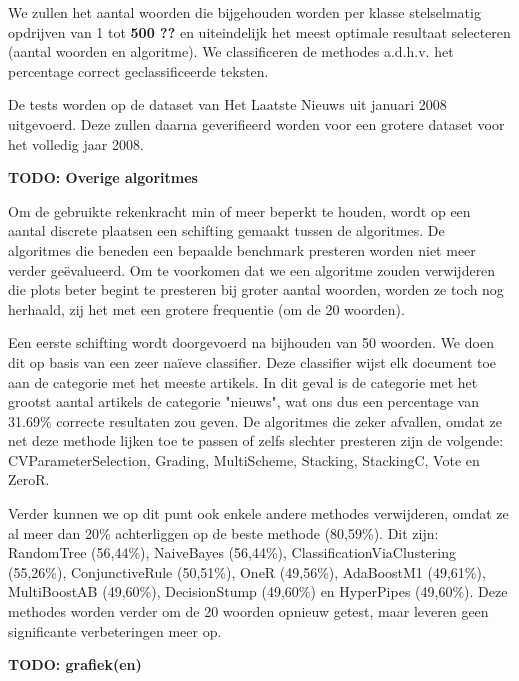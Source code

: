 We zullen het aantal woorden die bijgehouden worden per klasse stelselmatig opdrijven van 1 tot \textbf{500 ??} en uiteindelijk het meest optimale resultaat selecteren (aantal woorden en algoritme). We classificeren de methodes a.d.h.v. het percentage correct geclassificeerde teksten.

De tests worden op de dataset van Het Laatste Nieuws uit januari 2008 uitgevoerd. Deze zullen daarna geverifieerd worden voor een grotere dataset voor het volledig jaar 2008. 

\textbf{TODO: Overige algoritmes}

Om de gebruikte rekenkracht min of meer beperkt te houden, wordt op een aantal discrete plaatsen een schifting gemaakt tussen de algoritmes. De algoritmes die beneden een bepaalde benchmark presteren worden niet meer verder ge\"evalueerd. Om te voorkomen dat we een algoritme zouden verwijderen die plots beter begint te presteren bij groter aantal woorden, worden ze toch nog herhaald, zij het met een grotere frequentie (om de 20 woorden).

Een eerste schifting wordt doorgevoerd na bijhouden van 50 woorden. We doen dit op basis van een zeer na\"ieve classifier. Deze classifier wijst elk document toe aan de categorie met het meeste artikels. In dit geval is de categorie met het grootst aantal artikels de categorie "nieuws", wat ons dus een percentage van 31.69\% correcte resultaten zou geven. De algoritmes die zeker afvallen, omdat ze net deze methode lijken toe te passen of zelfs slechter presteren zijn de volgende: CVParameterSelection, Grading, MultiScheme, Stacking, StackingC, Vote en ZeroR.

Verder kunnen we op dit punt ook enkele andere methodes verwijderen, omdat ze al meer dan 20\% achterliggen op de beste methode (80,59\%). Dit zijn: RandomTree (56,44\%), NaiveBayes (56,44\%), ClassificationViaClustering (55,26\%), ConjunctiveRule (50,51\%), OneR (49,56\%), AdaBoostM1 (49,61\%), MultiBoostAB (49,60\%), DecisionStump (49,60\%) en HyperPipes (49,60\%). 
Deze methodes worden verder om de 20 woorden opnieuw getest, maar leveren geen significante verbeteringen meer op.

\textbf{TODO: grafiek(en)}
